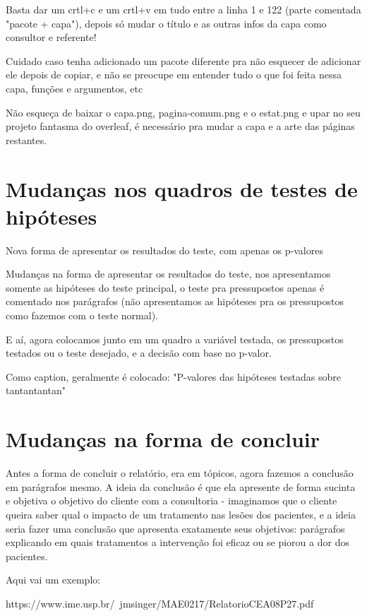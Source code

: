 \documentclass[a4paper, 12pt]{article} %
\begin{document}
Basta dar um crtl+c e um crtl+v em tudo entre a linha 1 e 122 (parte comentada "pacote + capa"), depois só mudar o título e as outras infos da capa como consultor e referente!

Cuidado caso tenha adicionado um pacote diferente pra não esquecer de adicionar ele depois de copiar, e não se preocupe em entender tudo o que foi feita nessa capa, funções e argumentos, etc

Não esqueça de baixar o capa.png, pagina-comum.png e o estat.png e upar no seu projeto fantasma do overleaf, é necessário pra mudar a capa e a arte das páginas restantes.

\section{Mudanças nos quadros de testes de hipóteses}

\begin{quadro}[H]
\centering
\caption{Nova forma de apresentar os resultados do teste, com apenas os p-valores}
\label{R-Q-Teste-1}
\vspace{0.1cm}
\end{quadro}

Mudanças na forma de apresentar os resultados do teste, nos apresentamos somente as hipóteses do teste principal, o teste pra pressupostos apenas é comentado nos parágrafos (não apresentamos as hipóteses pra os pressupostos como fazemos com o teste normal).

E aí, agora colocamos junto em um quadro a variável testada, os pressupostos testados ou o teste desejado, e a decisão com base no p-valor.

Como caption, geralmente é colocado: "P-valores das hipóteses testadas sobre tantantantan"

\section{Mudanças na forma de concluir}

Antes a forma de concluir o relatório, era em tópicos, agora fazemos a conclusão em parágrafos mesmo. A ideia da conclusão é que ela apresente de forma sucinta e objetiva o objetivo do cliente com a consultoria - imaginamos que o cliente queira saber qual o impacto de um tratamento nas lesões dos pacientes, e a ideia seria fazer uma conclusão que apresenta exatamente seus objetivos: parágrafos explicando em quais tratamentos a intervenção foi eficaz ou se piorou a dor dos pacientes.

Aqui vai um exemplo: 

https://www.ime.usp.br/~jmsinger/MAE0217/RelatorioCEA08P27.pdf
\end{document}
